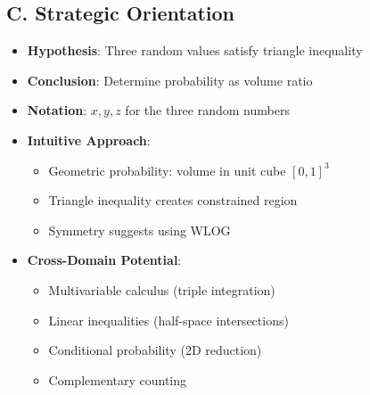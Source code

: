 \documentclass[11pt]{article}
\begin{document}
\begin{problemconfigbox}
\subsection*{C. Strategic Orientation}
\begin{itemize}[leftmargin=*]
    \item \textbf{Hypothesis}: Three random values satisfy triangle inequality
    \item \textbf{Conclusion}: Determine probability as volume ratio
    \item \textbf{Notation}: $x, y, z$ for the three random numbers
    \item \textbf{Intuitive Approach}: 
    \begin{itemize}
        \item Geometric probability: volume in unit cube $[0,1]^3$
        \item Triangle inequality creates constrained region
        \item Symmetry suggests using WLOG
    \end{itemize}
    \item \textbf{Cross-Domain Potential}: 
    \begin{itemize}
        \item Multivariable calculus (triple integration)
        \item Linear inequalities (half-space intersections)
        \item Conditional probability (2D reduction)
        \item Complementary counting
    \end{itemize}
\end{itemize}
\end{problemconfigbox}
\end{document}

